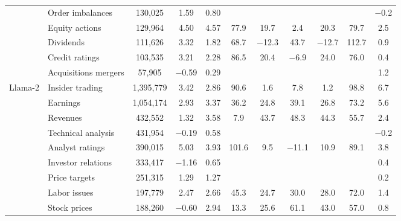 \begin{table}[htbp]
{\begin{adjustbox}{max width=\linewidth, max totalheight=0.75\textheight}
\begin{tabular}{llccccccccc}
 & Order imbalances & \phantom{,0}130,025 & \phantom{$-$}1.59 & \phantom{$-$}0.80 &  &  &  &  &  & $-$0.2 \\
 & Equity actions & \phantom{,0}129,964 & \phantom{$-$}4.50 & \phantom{$-$}4.57 & \phantom{0}77.9 & \phantom{$-$}19.7 & \phantom{$-$0}2.4 & \phantom{$-$}20.3 & \phantom{0}79.7 & \phantom{$-$}2.5 \\
 & Dividends & \phantom{,0}111,626 & \phantom{$-$}3.32 & \phantom{$-$}1.82 & \phantom{0}68.7 & $-$12.3 & \phantom{$-$}43.7 & $-$12.7 & 112.7 & \phantom{$-$}0.9 \\
 & Credit ratings & \phantom{,0}103,535 & \phantom{$-$}3.21 & \phantom{$-$}2.28 & \phantom{0}86.5 & \phantom{$-$}20.4 & \phantom{0}$-$6.9 & \phantom{$-$}24.0 & \phantom{0}76.0 & \phantom{$-$}0.4 \\
 & Acquisitions mergers & \phantom{,00}57,905 & $-$0.59 & \phantom{$-$}0.29 &  &  &  &  &  & \phantom{$-$}1.2 \\
\midrule
Llama-2 & Insider trading & 1,395,779 & \phantom{$-$}3.42 & \phantom{$-$}2.86 & \phantom{0}90.6 & \phantom{$-$0}1.6 & \phantom{$-$0}7.8 & \phantom{$-$0}1.2 & \phantom{0}98.8 & \phantom{$-$}6.7 \\
 & Earnings & 1,054,174 & \phantom{$-$}2.93 & \phantom{$-$}3.37 & \phantom{0}36.2 & \phantom{$-$}24.8 & \phantom{$-$}39.1 & \phantom{$-$}26.8 & \phantom{0}73.2 & \phantom{$-$}5.6 \\
 & Revenues & \phantom{,0}432,552 & \phantom{$-$}1.32 & \phantom{$-$}3.58 & \phantom{00}7.9 & \phantom{$-$}43.7 & \phantom{$-$}48.3 & \phantom{$-$}44.3 & \phantom{0}55.7 & \phantom{$-$}2.4 \\
 & Technical analysis & \phantom{,0}431,954 & $-$0.19 & \phantom{$-$}0.58 &  &  &  &  &  & $-$0.2 \\
 & Analyst ratings & \phantom{,0}390,015 & \phantom{$-$}5.03 & \phantom{$-$}3.93 & 101.6 & \phantom{$-$0}9.5 & $-$11.1 & \phantom{$-$}10.9 & \phantom{0}89.1 & \phantom{$-$}3.8 \\
 & Investor relations & \phantom{,0}333,417 & $-$1.16 & \phantom{$-$}0.65 &  &  &  &  &  & \phantom{$-$}0.4 \\
 & Price targets & \phantom{,0}251,315 & \phantom{$-$}1.29 & \phantom{$-$}1.27 &  &  &  &  &  & \phantom{$-$}0.2 \\
 & Labor issues & \phantom{,0}197,779 & \phantom{$-$}2.47 & \phantom{$-$}2.66 & \phantom{0}45.3 & \phantom{$-$}24.7 & \phantom{$-$}30.0 & \phantom{$-$}28.0 & \phantom{0}72.0 & \phantom{$-$}1.4 \\
 & Stock prices & \phantom{,0}188,260 & $-$0.60 & \phantom{$-$}2.94 & \phantom{0}13.3 & \phantom{$-$}25.6 & \phantom{$-$}61.1 & \phantom{$-$}43.0 & \phantom{0}57.0 & \phantom{$-$}0.8 \\

\end{tabular}
\end{adjustbox}}
\end{table}
